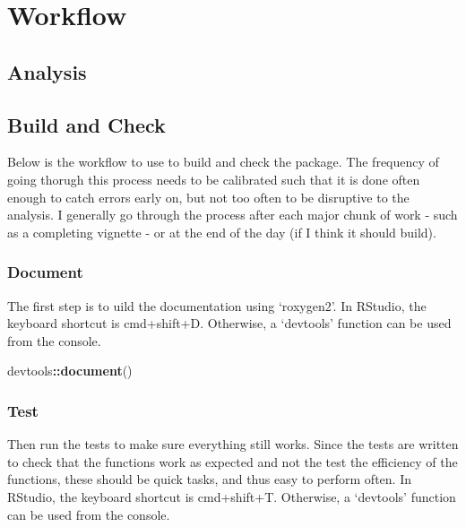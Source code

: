 \documentclass[]{book}
\newenvironment{Shaded}{\begin{snugshade}}{\end{snugshade}}
\newcommand{\KeywordTok}[1]{\textcolor[rgb]{0.13,0.29,0.53}{\textbf{#1}}}
\newcommand{\NormalTok}[1]{#1}
\newcommand{\OperatorTok}[1]{\textcolor[rgb]{0.81,0.36,0.00}{\textbf{#1}}}
\begin{document}
\hypertarget{workflow}{%
\chapter{Workflow}\label{workflow}}

\hypertarget{analysis}{%
\section{Analysis}\label{analysis}}

\hypertarget{build-and-check}{%
\section{Build and Check}\label{build-and-check}}

Below is the workflow to use to build and check the package. The frequency of going thorugh this process needs to be calibrated such that it is done often enough to catch errors early on, but not too often to be disruptive to the analysis. I generally go through the process after each major chunk of work - such as a completing vignette - or at the end of the day (if I think it should build).

\hypertarget{document}{%
\subsection{Document}\label{document}}

The first step is to uild the documentation using `roxygen2'. In RStudio, the keyboard shortcut is cmd+shift+D. Otherwise, a `devtools' function can be used from the console.

\begin{Shaded}
\begin{Highlighting}[]
\NormalTok{devtools}\OperatorTok{::}\KeywordTok{document}\NormalTok{()}
\end{Highlighting}
\end{Shaded}

\hypertarget{test}{%
\subsection{Test}\label{test}}

Then run the tests to make sure everything still works. Since the tests are written to check that the functions work as expected and not the test the efficiency of the functions, these should be quick tasks, and thus easy to perform often. In RStudio, the keyboard shortcut is cmd+shift+T. Otherwise, a `devtools' function can be used from the console.
\end{document}

